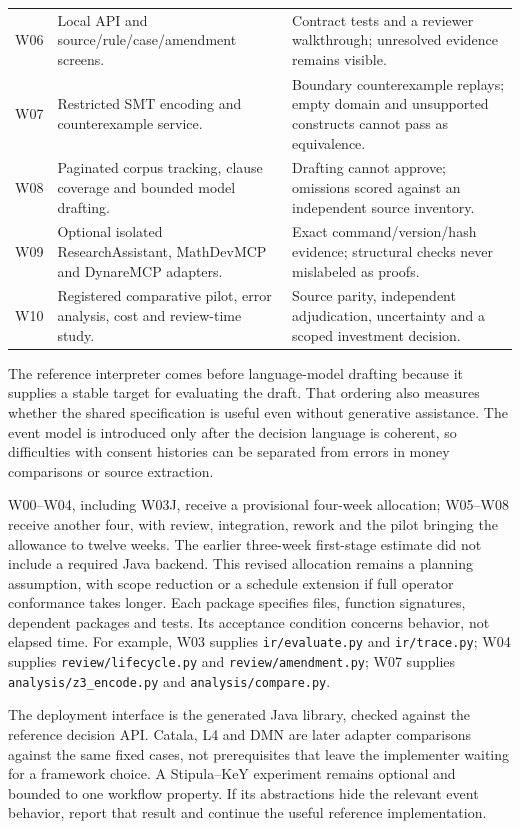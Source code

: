 \documentclass[12pt,a4paper,oneside,openany]{book}
\begin{document}
\begin{longtable}{P{0.12\textwidth}P{0.42\textwidth}P{0.36\textwidth}}
W06 & Local API and source/rule/case/amendment screens. & Contract tests and a reviewer walkthrough; unresolved evidence remains visible.\\
W07 & Restricted SMT encoding and counterexample service. & Boundary counterexample replays; empty domain and unsupported constructs cannot pass as equivalence.\\
W08 & Paginated corpus tracking, clause coverage and bounded model drafting. & Drafting cannot approve; omissions scored against an independent source inventory.\\
W09 & Optional isolated ResearchAssistant, MathDevMCP and DynareMCP adapters. & Exact command/version/hash evidence; structural checks never mislabeled as proofs.\\
W10 & Registered comparative pilot, error analysis, cost and review-time study. & Source parity, independent adjudication, uncertainty and a scoped investment decision.\\
\bottomrule
\end{longtable}
\endgroup

The reference interpreter comes before language-model drafting because it supplies
a stable target for evaluating the draft. That ordering also measures whether the
shared specification is useful even without generative assistance. The event
model is introduced only after the decision language is coherent, so difficulties
with consent histories can be separated from errors in money comparisons or
source extraction.

W00--W04, including W03J, receive a provisional four-week allocation; W05--W08
receive another four, with review, integration, rework and the pilot bringing
the allowance to twelve weeks. The earlier three-week first-stage estimate did
not include a required Java backend. This revised allocation remains a planning
assumption, with scope reduction or a schedule extension if full operator
conformance takes longer. Each package specifies files, function signatures, dependent
packages and tests. Its acceptance condition concerns behavior, not elapsed time.
For example, W03 supplies \texttt{ir/evaluate.py} and \texttt{ir/trace.py}; W04
supplies \texttt{review/lifecycle.py} and \texttt{review/amendment.py}; W07
supplies \texttt{analysis/z3\_encode.py} and \texttt{analysis/compare.py}.

The deployment interface is the generated Java library, checked against the
reference decision API. Catala, L4 and DMN
are later adapter comparisons against the same fixed cases, not prerequisites
that leave the implementer waiting for a framework choice. A Stipula--KeY
experiment remains optional and bounded to one workflow property. If its
abstractions hide the relevant event behavior, report that result and continue
the useful reference implementation.
\end{document}
